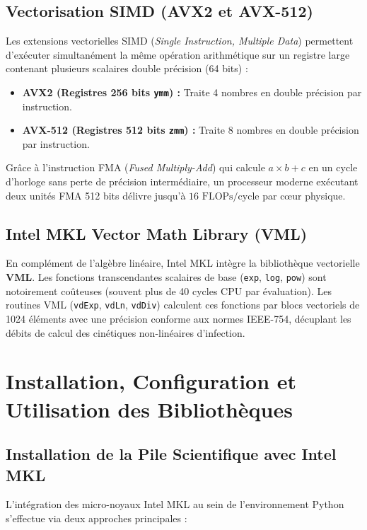 \documentclass[11pt,a4paper]{report}
\theoremstyle{plain}
\theoremstyle{definition}
\theoremstyle{remark}
\begin{document}
\section{Vectorisation SIMD (AVX2 et AVX-512)}
Les extensions vectorielles SIMD (\textit{Single Instruction, Multiple Data}) permettent d'exécuter simultanément la même opération arithmétique sur un registre large contenant plusieurs scalaires double précision (64 bits) :
\begin{itemize}
    \item \textbf{AVX2 (Registres 256 bits \texttt{ymm}) :} Traite 4 nombres en double précision par instruction.
    \item \textbf{AVX-512 (Registres 512 bits \texttt{zmm}) :} Traite 8 nombres en double précision par instruction.
\end{itemize}
Grâce à l'instruction FMA (\textit{Fused Multiply-Add}) qui calcule $a \times b + c$ en un cycle d'horloge sans perte de précision intermédiaire, un processeur moderne exécutant deux unités FMA 512 bits délivre jusqu'à $16 \text{ FLOPs/cycle}$ par cœur physique.

\section{Intel MKL Vector Math Library (VML)}
En complément de l'algèbre linéaire, Intel MKL intègre la bibliothèque vectorielle \textbf{VML}. Les fonctions transcendantes scalaires de base (\texttt{exp}, \texttt{log}, \texttt{pow}) sont notoirement coûteuses (souvent plus de 40 cycles CPU par évaluation). Les routines VML (\texttt{vdExp}, \texttt{vdLn}, \texttt{vdDiv}) calculent ces fonctions par blocs vectoriels de 1024 éléments avec une précision conforme aux normes IEEE-754, décuplant les débits de calcul des cinétiques non-linéaires d'infection.

\chapter{Installation, Configuration et Utilisation des Bibliothèques}

\section{Installation de la Pile Scientifique avec Intel MKL}
L'intégration des micro-noyaux Intel MKL au sein de l'environnement Python s'effectue via deux approches principales :
\end{document}
